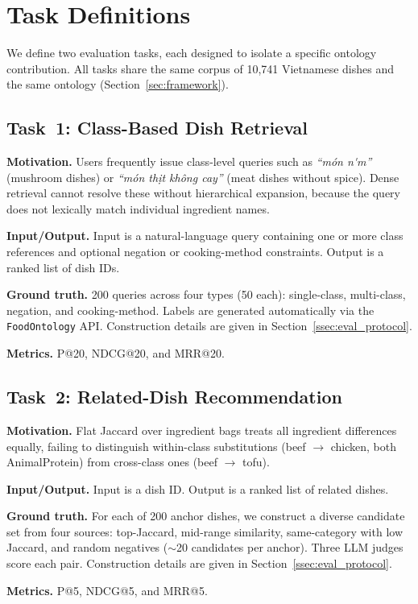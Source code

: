 \section{Task Definitions}
\label{sec:tasks}

We define two evaluation tasks, each designed to isolate a specific ontology contribution. All tasks share the same corpus of 10{,}741 Vietnamese dishes and the same ontology (Section~\ref{sec:framework}).

\subsection{Task~1: Class-Based Dish Retrieval}
\label{ssec:task1}

\textbf{Motivation.} Users frequently issue class-level queries such as \textit{``m\'{o}n n\'\acircumflex{}m''} (mushroom dishes) or \textit{``m\'{o}n th\d{i}t kh\^{o}ng cay''} (meat dishes without spice). Dense retrieval cannot resolve these without hierarchical expansion, because the query does not lexically match individual ingredient names.

\textbf{Input/Output.} Input is a natural-language query containing one or more class references and optional negation or cooking-method constraints. Output is a ranked list of dish IDs.

\textbf{Ground truth.} 200 queries across four types (50 each): single-class, multi-class, negation, and cooking-method. Labels are generated automatically via the \texttt{FoodOntology} API. Construction details are given in Section~\ref{ssec:eval_protocol}.

\textbf{Metrics.} P@20, NDCG@20, and MRR@20.

\subsection{Task~2: Related-Dish Recommendation}
\label{ssec:task2}

\textbf{Motivation.} Flat Jaccard over ingredient bags treats all ingredient differences equally, failing to distinguish within-class substitutions (beef $\to$ chicken, both AnimalProtein) from cross-class ones (beef $\to$ tofu).

\textbf{Input/Output.} Input is a dish ID. Output is a ranked list of related dishes.

\textbf{Ground truth.} For each of 200 anchor dishes, we construct a diverse candidate set from four sources: top-Jaccard, mid-range similarity, same-category with low Jaccard, and random negatives (${\sim}$20 candidates per anchor). Three LLM judges score each pair. Construction details are given in Section~\ref{ssec:eval_protocol}.

\textbf{Metrics.} P@5, NDCG@5, and MRR@5.
